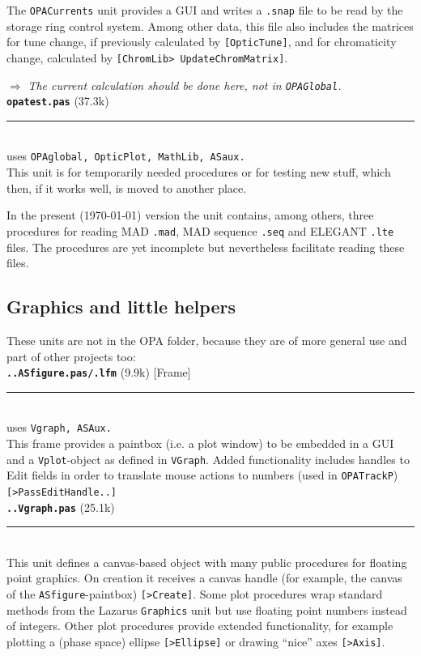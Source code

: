 \documentclass[12pt]{article}
\newcommand\todo[1]{$\Longrightarrow$ {\em #1} }
\newcommand\code[1]{{\tt [#1]}}
\newcommand\opamodule[3]{{\bf \tt #1} #2\\  \rule[3pt]{\textwidth}{0.2pt} \\ {\scriptsize uses \tt  #3}\\[1ex]}
\newcommand\opamoduleN[2]{{\bf \tt #1} #2\\  \rule[3pt]{\textwidth}{0.2pt} \\}
\begin{document}
The {\tt OPACurrents} unit provides a GUI and writes a {\tt .snap} file to be read by the storage ring control system. Among other data, this file also includes the matrices for tune change, if previously calculated by \code{OpticTune}, and for chromaticity change, calculated by \code{ChromLib> UpdateChromMatrix}.

\todo{The current calculation should be done here, not in {\tt OPAGlobal}.}\\


\opamodule{opatest.pas}{(37.3k)}{OPAglobal, OpticPlot, MathLib, ASaux.}
This unit is for temporarily needed procedures or for testing new stuff, which then, if it works well, is moved to another place.

In the present (\today) version the unit contains, among others, three procedures for reading MAD {\tt .mad}, MAD sequence {\tt .seq} and ELEGANT {\tt .lte} files. The procedures are yet incomplete but nevertheless facilitate reading these files.\\


\subsection{Graphics and little helpers}

%

These units are not in the OPA folder, because they are of more general use and part of other projects too:\\

\opamodule{..ASfigure.pas/.lfm}{(9.9k) [Frame]}{Vgraph, ASAux.}
This frame provides a paintbox (i.e. a plot window) to be embedded in a GUI and a {\tt Vplot}-object as defined in {\tt VGraph}. Added functionality includes handles to Edit fields in order to translate mouse actions to numbers (used in {\tt OPATrackP}) \code{>PassEditHandle..} \\

\opamoduleN{..Vgraph.pas}{(25.1k)}
This unit defines a canvas-based object with many public procedures for floating point graphics.
On creation it receives a canvas handle (for example, the canvas of the {\tt ASfigure}-paintbox) \code{>Create}.
Some plot procedures wrap standard methods from the Lazarus {\tt Graphics} unit but use floating point numbers instead of integers.
Other plot procedures provide extended functionality, for example plotting a (phase space) ellipse \code{>Ellipse} or drawing ``nice'' axes \code{>Axis}.\\
\end{document}
